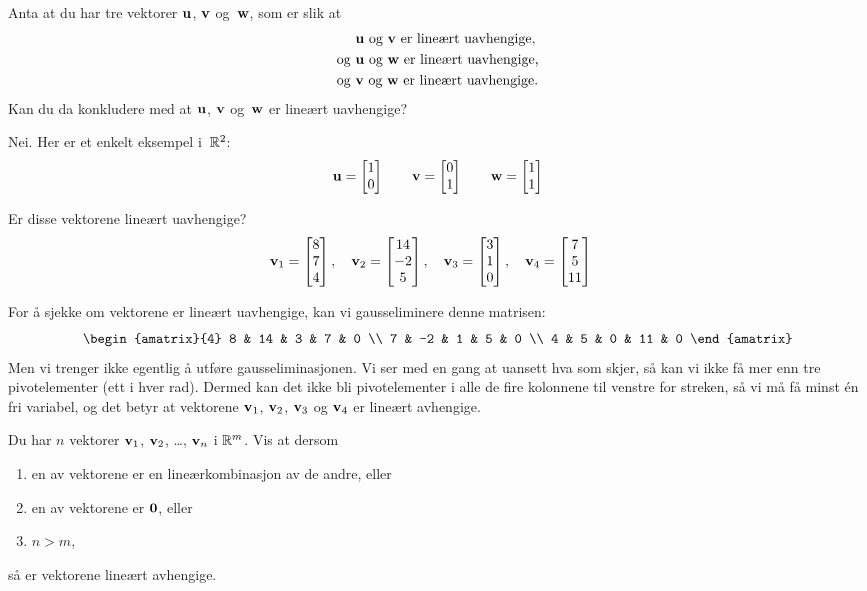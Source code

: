\begin{oppgave}
Anta at du har tre vektorer $\mathbf{u}$, $\mathbf{v}$ og~$\mathbf{w}$, som er slik at
\begin{align*}
  &\text{$\mathbf{u}$ og~$\mathbf{v}$ er lineært uavhengige,} \\
  \text{og }
  &\text{$\mathbf{u}$ og~$\mathbf{w}$ er lineært uavhengige,} \\
  \text{og }
  &\text{$\mathbf{v}$ og~$\mathbf{w}$ er lineært uavhengige.}
\end{align*}
Kan du da konkludere med at $\mathbf{u}$, $\mathbf{v}$ og~$\mathbf{w}$ er lineært uavhengige?
\end{oppgave}

\begin{losning}
Nei.  Her er et enkelt eksempel i~$\mathbb{R}^2$:
\[
\mathbf{u} = \begin{bmatrix} 1 \\ 0 \end{bmatrix}
\qquad
\mathbf{v} = \begin{bmatrix} 0 \\ 1 \end{bmatrix}
\qquad
\mathbf{w} = \begin{bmatrix} 1 \\ 1 \end{bmatrix}
\]
\end{losning}


\begin{oppgave}
Er disse vektorene lineært uavhengige?
\[
\mathbf{v}_1 = \begin{bmatrix} 8 \\ 7 \\ 4 \end{bmatrix},\quad
\mathbf{v}_2 = \begin{bmatrix} 14 \\ -2 \\ 5 \end{bmatrix},\quad
\mathbf{v}_3 = \begin{bmatrix} 3 \\ 1 \\ 0 \end{bmatrix},\quad
\mathbf{v}_4 = \begin{bmatrix} 7 \\ 5 \\ 11 \end{bmatrix}\quad
\]
\end{oppgave}

\begin{losning}
For å sjekke om vektorene er lineært uavhengige, kan vi gausseliminere
denne matrisen:
\[
\begin{amatrix}{4}
8 & 14 & 3 & 7 & 0 \\
7 & -2 & 1 & 5 & 0 \\
4 & 5 & 0 & 11 & 0
\end{amatrix}
\]
Men vi trenger ikke egentlig å utføre gausseliminasjonen.  Vi ser med
en gang at uansett hva som skjer, så kan vi ikke få mer enn tre
pivotelementer (ett i hver rad).  Dermed kan det ikke bli
pivotelementer i alle de fire kolonnene til venstre for streken, så vi
må få minst én fri variabel, og det betyr at vektorene $\mathbf{v}_1$,
$\mathbf{v}_2$, $\mathbf{v}_3$ og $\mathbf{v}_4$ er lineært avhengige.
\end{losning}


\begin{oppgave}
Du har $n$ vektorer $\mathbf{v}_1$, $\mathbf{v}_2$, \ldots, $\mathbf{v}_n$ i $\mathbb{R}^m$.
Vis at dersom
\begin{enumerate}
\item en av vektorene er en lineærkombinasjon av de andre, eller
\item en av vektorene er $\mathbf{0}$, eller
\item $n > m$,
\end{enumerate}
så er vektorene lineært avhengige.
\end{oppgave}

